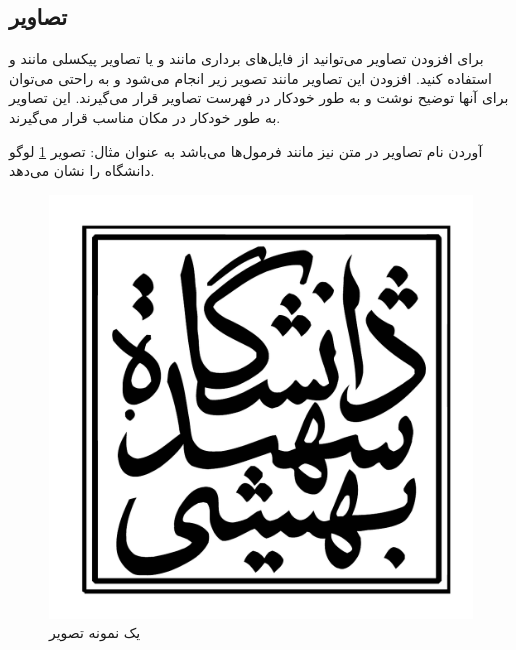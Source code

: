 \subsection{تصاویر}
برای افزودن تصاویر می‌توانید از فایل‌‌های برداری مانند  و یا تصاویر پیکسلی مانند  و  استفاده کنید. افزودن این تصاویر مانند تصویر زیر انجام می‌شود و به راحتی می‌توان برای آنها توضیح نوشت و به طور خودکار در فهرست تصاویر قرار می‌گیرند. این تصاویر به طور خودکار در مکان مناسب قرار می‌گیرند.
\par
آوردن نام تصاویر در متن نیز مانند فرمول‌ها می‌باشد به عنوان مثال: تصویر \ref{fig:logo} لوگو دانشگاه را نشان می‌دهد.
\begin{figure}[tb]
	\centering
	\includegraphics[width=.6\linewidth]{logo}
	\caption {یک نمونه تصویر}
	\label{fig:logo}
\end{figure}
\par
